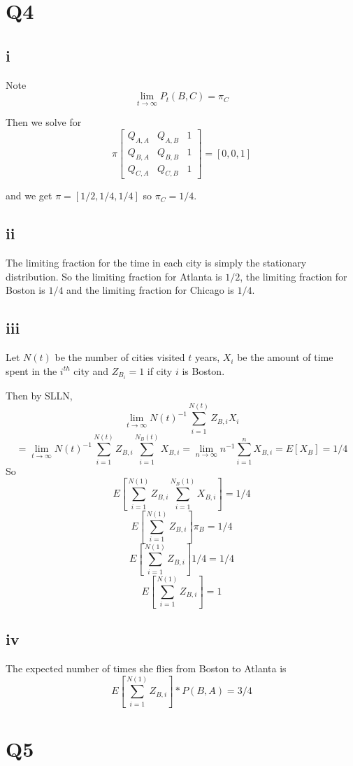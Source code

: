 \documentclass{article}
\begin{document}
\section*{Q4}
\subsection*{i}
Note
$$
\lim_{t \to \infty} P_t(B,C) = \pi_C
$$

Then we solve for
$$
\pi \begin{bmatrix}
Q_{A,A} & Q_{A,B} & 1 \\
Q_{B,A} & Q_{B,B} & 1 \\
Q_{C,A} & Q_{C,B} & 1
\end{bmatrix}
= [0, 0, 1]
$$


and we get $\pi = [ 1/2,1/4, 1/4]$
so $\pi_C = 1/4$.

\subsection*{ii}
The limiting fraction for the time in each city is simply the stationary distribution.
So
the limiting fraction for Atlanta is $1/2$, the limiting fraction for Boston is $1/4$ and the limiting fraction for Chicago is $1/4$.

\subsection*{iii}
Let $N(t)$ be the number of cities visited $t$ years, $X_{i}$ be the amount of time spent in the $i^{th}$ city and $Z_{B_i} = 1$ if city $i$ is Boston.

Then by SLLN,
$$
\lim_{t \to \infty} N(t)^{-1} \sum_{i =1}^{N(t)} Z_{B,i}X_{i} 
$$
$$
=\lim_{t \to \infty} N(t)^{-1} \sum_{i=1}^{N(t)} Z_{B,i}\sum_{i =1}^{N_B(t)} X_{B,i} = \lim_{n \to \infty} n^{-1} \sum_{i =1}^{n} X_{B,i} = E[X_B] = 1/4
$$
So
$$
E[\sum_{i=1}^{N(1)} Z_{B,i}\sum_{i =1}^{N_B(1)} X_{B,i}] = 1/4
$$
$$
E[\sum_{i=1}^{N(1)} Z_{B,i}] \pi_B = 1/4
$$
$$
E[\sum_{i=1}^{N(1)} Z_{B,i}] 1/4 = 1/4
$$
$$
E[\sum_{i=1}^{N(1)} Z_{B,i}] = 1
$$

\subsection*{iv}
The expected number of times she flies from Boston to Atlanta is
$$
E[\sum_{i=1}^{N(1)} Z_{B,i}] * P(B,A) = 3/4
$$

\section*{Q5}
\end{document}
